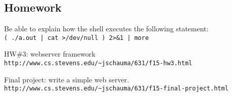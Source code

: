 \documentclass[xga]{xdvislides}
\begin{document}
\subsection{Homework}
Be able to explain how the shell executes the following statement: \\
{\tt ( ./a.out | cat >/dev/null ) 2>\&1 | more}

\vspace{.5in}
HW\#3: webserver framework \\
{\tt http://www.cs.stevens.edu/\~{}jschauma/631/f15-hw3.html}

\vspace{.5in}
Final project: write a simple web server. \\
{\tt http://www.cs.stevens.edu/\~{}jschauma/631/f15-final-project.html}
\end{document}
